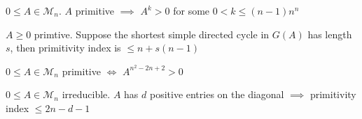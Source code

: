 \documentclass[aspectratio=43]{beamer}
\def\M{\mathcal{M}}
\begin{document}
\begin{frame}
\begin{theorem}
$0\leq A\in \M_n$. $A$ primitive $\implies$ $A^k>0$ for some $0<k\leq (n-1)n^n$
\end{theorem}
\vfill
\begin{theorem}
$A\geq 0$ primtive. Suppose the shortest simple directed cycle in $G(A)$ has length $s$, then primitivity index is $\leq n+s(n-1)$
\end{theorem}
\vfill
\begin{theorem}
$0\leq A\in \M_n$ primitive $\iff$ $A^{n^2-2n+2}>0$
\end{theorem}
\vfill
\begin{theorem}
	$0\leq A\in \M_n$ irreducible. $A$ has $d$ positive entries on the diagonal $\implies$ primitivity index $\leq 2n-d-1$
\end{theorem}
\end{frame}
\end{document}
